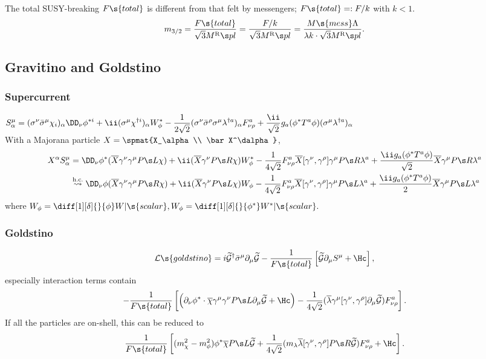 The total SUSY-breaking $F\s{total}$ is different from that felt by messengers; $F\s{total}=:F/k$ with $k<1$.
\begin{equation}
 m_{3/2}
= \frac{F\s{total}}{\sqrt3\rMPL}
= \frac{F/k}{\sqrt3\rMPL}
= \frac{M\s{mess}\Lambda}{\lambda k\cdot\sqrt3\rMPL}.
\end{equation}

\newpage

\subsection{Gravitino and Goldstino}
\def\goldi{\tilde{\cal G}}
\subsubsection{Supercurrent}
$\displaystyle S^\mu_\alpha = (\Sn\bSm\chi_i)_\alpha\Dn\phi^{*i} + \ii(\Sm\chi^{\dagger i})_\alpha W_\phi^* -\frac{1}{2\sqrt2}(\Sn\bSr\Sm\lambda^{\dagger a})_\alpha F^a_{\nu\rho}
+\frac{\ii}{\sqrt2}g_a(\phi^*T^a\phi)(\Sm\lambda^{\dagger a})_\alpha$\\
With a Majorana particle $X=\spmat{X_\alpha\\ \bar X^\dalpha}$,\vspace{-10pt}
\begin{align*}
X^\alpha S^\mu_\alpha&=
  \Dn\phi^*(\overline X\Gn\Gm\PL\chi) + \ii(\overline X\Gn\PR\chi)W_\phi^*-\frac{1}{4\sqrt2}F^a_{\nu\rho}\overline X[\Gn,\Gr]\Gm\PR\lambda^a+\frac{\ii g_a(\phi^* T^a\phi)}{\sqrt2}\overline X\Gm\PR\lambda^a\\
&\buildrel{\text{h.c.}}\over\leadsto
 \Dn\phi(\overline X\Gn\Gm\PR\chi) + \ii(\overline X\Gn\PL\chi)W_\phi-\frac{1}{4\sqrt2}F^a_{\nu\rho}\overline X[\Gn,\Gr]\Gm\PL\lambda^a+
\frac{\ii g_a(\phi^* T^a\phi)}{2}\overline X\Gm\PL\lambda^a
 \end{align*}
where $W_\phi=\diff[1][\delta]{}{\phi}W|\s{scalar}, W_\phi=\diff[1][\delta]{}{\phi^*}W^*|\s{scalar}.$

\subsubsection{Goldstino}
\begin{equation}
 \Lag\s{goldstino}=i\goldi^\dagger \bSm\Pm\goldi-\frac{1}{F\s{total}}\left[\goldi\Pm S^\mu+\Hc\right],
\end{equation}
especially interaction terms contain\\
\begin{equation}
-\frac{1}{F\s{total}}
\left[\left(\Pn\phi^*\cdot\overline\chi\Gm\Gn\PL\Pm\goldi+\Hc\right)
-\frac{1}{4\sqrt2}(\overline\lambda\Gm[\Gn,\Gr]\Pm\goldi)F^a_{\nu\rho}\right].
\end{equation}
If all the particles are on-shell, this can be reduced to
\begin{equation}
\frac{1}{F\s{total}}
\left[
(m_\chi^2-m_\phi^2)\phi^*\overline\chi\PL\goldi
+\frac{1}{4\sqrt2}(m_\lambda \overline\lambda[\Gn,\Gr]\PR\goldi)F^a_{\nu\rho}
+\Hc\right].
\end{equation}

